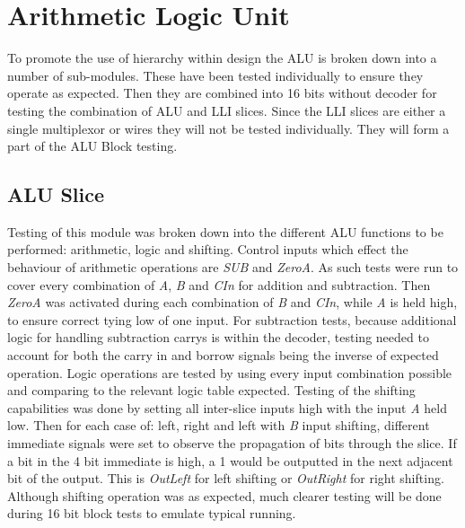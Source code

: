 
\section{Arithmetic Logic Unit}
To promote the use of hierarchy within design the ALU is broken down into a number of sub-modules. 
These have been tested individually to ensure they operate as expected. 
Then they are combined into 16 bits without decoder for testing the combination of ALU and LLI slices. 
Since the LLI slices are either a single multiplexor or wires they will not be tested individually. 
They will form a part of the ALU Block testing. 

\subsection{ALU Slice}
Testing of this module was broken down into the different ALU functions to be performed: arithmetic, logic and shifting. 
Control inputs which effect the behaviour of arithmetic operations are \textit{SUB} and \textit{ZeroA}. 
As such tests were run to cover every combination of \textit{A}, \textit{B} and \textit{CIn} for addition and subtraction. 
Then \textit{ZeroA} was activated during each combination of \textit{B} and \textit{CIn}, while \textit{A} is held high, to ensure correct tying low of one input. 
For subtraction tests, because additional logic for handling subtraction carrys is within the decoder, testing needed to account for both the carry in and borrow signals being the inverse of expected operation.
Logic operations are tested by using every input combination possible and comparing to the relevant logic table expected.
Testing of the shifting capabilities was done by setting all inter-slice inputs high with the input \textit{A} held low. Then for each case of: left, right and left with \textit{B} input shifting, different immediate signals were set to observe the propagation of bits through the slice. 
If a bit in the 4 bit immediate is high, a 1 would be outputted in the next adjacent bit of the output. 
This is \textit{OutLeft} for left shifting or \textit{OutRight} for right shifting.
Although shifting operation was as expected, much clearer testing will be done during 16 bit block tests to emulate typical running. 

